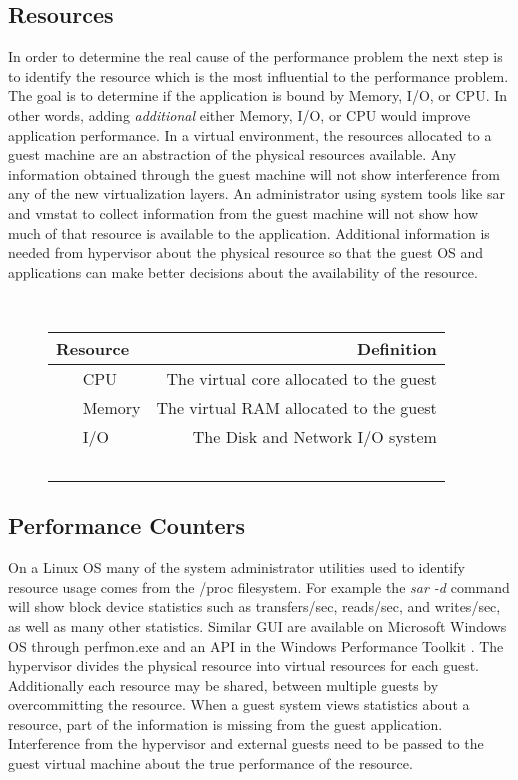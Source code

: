 \subsection{Resources}
In order to determine the real cause of the performance problem the next step is to identify the resource which is the most influential to the performance problem.  The goal is to determine if the application is bound by Memory, I/O, or CPU.  In other words, adding \emph{additional} either Memory, I/O, or CPU would improve application performance.  
In a virtual environment, the resources allocated to a guest machine are an abstraction of the physical resources available.   Any information obtained through the guest machine will not show interference from any of the new virtualization layers.  An administrator using system tools like sar and vmstat to collect information from the guest machine will not show how much of that resource is available to the application.  Additional information is needed from hypervisor about the physical resource so that the guest OS and applications can make better decisions about the availability of the resource. 
\begin{figure}
  \begin{tabular}{ l | r }
    Resource & Definition \\
    \hline
    CPU & The virtual core allocated to the guest \\ \hline
    Memory & The virtual RAM allocated to the guest \\ \hline
    I/O & The Disk and Network I/O system \\ \hline
  \end{tabular}
\label{fig:resources}
\end{figure}

\subsection{Performance Counters}
On a Linux OS many of the system administrator utilities used to identify resource usage comes from the /proc filesystem. For example the \emph{sar -d} command will show block device statistics such as transfers/sec, reads/sec, and writes/sec, as well as many other statistics.  Similar GUI are available on Microsoft Windows OS through perfmon.exe and an API in the Windows Performance Toolkit \cite{winperf}. The hypervisor divides the physical resource into virtual resources for each guest.  Additionally each resource may be shared, between multiple guests by overcommitting the resource.  When a guest system views statistics about a resource, part of the information is missing from the guest application.  Interference from the hypervisor and external guests need to be passed to the guest virtual machine about the true performance of the resource.

